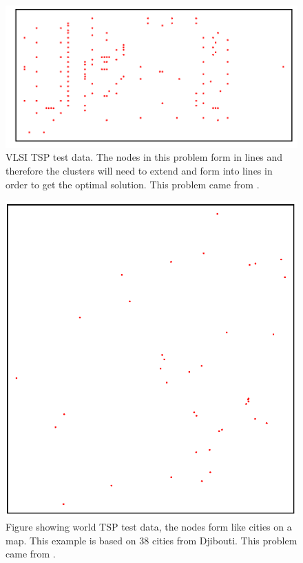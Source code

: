 \begin{figure}
    \centering
    \includegraphics[width=\textwidth]{figures/vlsi_xqf131_tsp_data.png}
    \caption{VLSI TSP test data. The nodes in this problem form in lines and therefore the clusters will need to extend and form into lines in order to get the optimal solution. This problem came from \cite{xqf131_tsp_instance}.}
    \label{fig:vlsi_tsp_data}
\end{figure}

\begin{figure}
    \centering
    \includegraphics[width=\textwidth]{figures/world_dj38_tsp_data.png}
    \caption{Figure showing world TSP test data, the nodes form like cities on a map. This example is based on 38 cities from Djibouti. This problem came from \cite{dj38_tsp_instance}.}
    \label{fig:world_tsp_data}
\end{figure}

